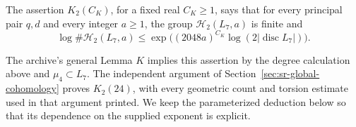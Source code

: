 \begin{srdefinition}
\label{def:sr-K2}
The assertion \(K_2(C_K)\), for a fixed real \(C_K\geq1\), says
that for every principal pair \(q,d\) and every integer \(a\geq1\),
the group \(\mathcal H_2(L_7,a)\) is finite and
\begin{equation}\label{eq:sr-K2}
 \log\#\mathcal H_2(L_7,a)
 \leq
 \exp\bigl((2048a)^{C_K}
                \log(2|\operatorname{disc}L_7|)\bigr).
\end{equation}
\end{srdefinition}
The archive's general Lemma \(K\) implies this assertion by the
degree calculation above and \(\mu_4\subset L_7\).
The independent argument of Section~\ref{sec:sr-global-cohomology}
proves \(K_2(24)\), with every geometric count and torsion estimate
used in that argument printed. We keep the parameterized deduction
below so that its dependence on the supplied exponent is explicit.

